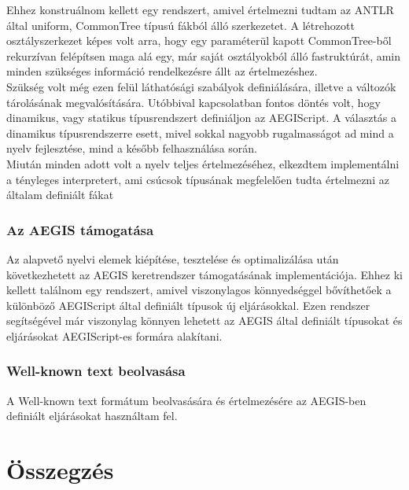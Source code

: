 \documentclass[a4paper,12pt]{report}
\begin{document}
Ehhez konstruálnom kellett egy rendszert, amivel értelmezni tudtam az ANTLR által uniform, CommonTree típusú fákból álló szerkezetet. A létrehozott osztályszerkezet képes volt arra, hogy egy paraméterül kapott CommonTree-ből rekurzívan felépítsen maga alá egy, már saját osztályokból álló fastruktúrát, amin minden szükséges információ rendelkezésre állt az értelmezéshez.\\
Szükség volt még ezen felül láthatósági szabályok definiálására, illetve a változók tárolásának megvalósítására. Utóbbival kapcsolatban fontos döntés volt, hogy dinamikus, vagy statikus típusrendszert definiáljon az AEGIScript. A választás a dinamikus típusrendszerre esett, mivel sokkal nagyobb rugalmasságot ad mind a nyelv fejlesztése, mind a később felhasználása során. \\
Miután minden adott volt a nyelv teljes értelmezéséhez, elkezdtem implementálni a tényleges interpretert, ami csúcsok típusának megfelelően tudta értelmezni az általam definiált fákat

\subsection{Az AEGIS támogatása}
Az alapvető nyelvi elemek kiépítése, tesztelése és optimalizálása után következhetett az AEGIS keretrendszer támogatásának implementációja. Ehhez ki kellett találnom egy rendszert, amivel viszonylagos könnyedséggel bővíthetőek a különböző AEGIScript által definiált típusok új eljárásokkal. Ezen rendszer segítségével már viszonylag könnyen lehetett az AEGIS által definiált típusokat és eljárásokat AEGIScript-es formára alakítani.

\subsection{Well-known text beolvasása}
A Well-known text formátum beolvasására és értelmezésére az AEGIS-ben definiált eljárásokat használtam fel.







\chapter{Összegzés}
\end{document}
